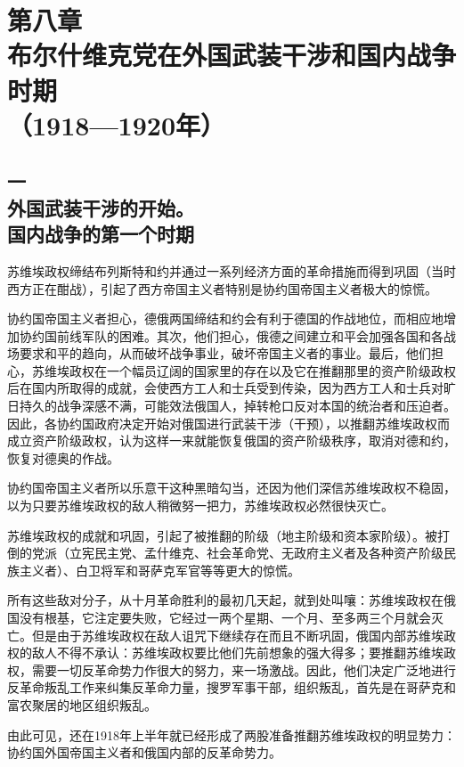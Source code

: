 \section[第八章\q 布尔什维克党在外国武装干涉和国内战争时期（1918—1920年）]{第八章\\ 布尔什维克党在外国武装干涉和国内战争时期 \\{（1918—1920年）}}

\subsection[一\q 外国武装干涉的开始。国内战争的第一个时期]{一\\ 外国武装干涉的开始。\\国内战争的第一个时期}

苏维埃政权缔结布列斯特和约并通过一系列经济方面的革命措施而得到巩固（当时西方正在酣战），引起了西方帝国主义者特别是协约国帝国主义者极大的惊慌。

协约国帝国主义者担心，德俄两国缔结和约会有利于德国的作战地位，而相应地增加协约国前线军队的困难。其次，他们担心，俄德之间建立和平会加强各国和各战场要求和平的趋向，从而破坏战争事业，破坏帝国主义者的事业。最后，他们担心，苏维埃政权在一个幅员辽阔的国家里的存在以及它在推翻那里的资产阶级政权后在国内所取得的成就，会使西方工人和士兵受到传染，因为西方工人和士兵对旷日持久的战争深感不满，可能效法俄国人，掉转枪口反对本国的统治者和压迫者。因此，各协约国政府决定开始对俄国进行武装干涉（干预），以推翻苏维埃政权而成立资产阶级政权，认为这样一来就能恢复俄国的资产阶级秩序，取消对德和约，恢复对德奥的作战。

协约国帝国主义者所以乐意干这种黑暗勾当，还因为他们深信苏维埃政权不稳固，以为只要苏维埃政权的敌人稍微努一把力，苏维埃政权必然很快灭亡。

苏维埃政权的成就和巩固，引起了被推翻的阶级（地主阶级和资本家阶级）。被打倒的党派（立宪民主党、孟什维克、社会革命党、无政府主义者及各种资产阶级民族主义者）、白卫将军和哥萨克军官等等更大的惊慌。

所有这些敌对分子，从十月革命胜利的最初几天起，就到处叫嚷：苏维埃政权在俄国没有根基，它注定要失败，它经过一两个星期、一个月、至多两三个月就会灭亡。但是由于苏维埃政权在敌人诅咒下继续存在而且不断巩固，俄国内部苏维埃政权的敌人不得不承认：苏维埃政权要比他们先前想象的强大得多；要推翻苏维埃政权，需要一切反革命势力作很大的努力，来一场激战。因此，他们决定广泛地进行反革命叛乱工作来纠集反革命力量，搜罗军事干部，组织叛乱，首先是在哥萨克和富农聚居的地区组织叛乱。

由此可见，还在1918年上半年就已经形成了两股准备推翻苏维埃政权的明显势力：协约国外国帝国主义者和俄国内部的反革命势力。

